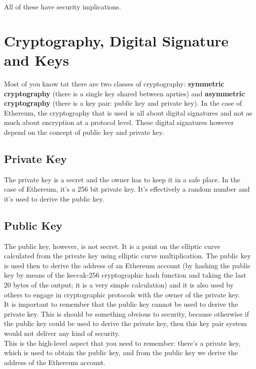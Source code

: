 All of these have security implications.

\section{Cryptography, Digital Signature and Keys}

Most of you know tat there are two classes of cryptography: \textbf{symmetric cryptography} (there is a single key shared between aprties) and \textbf{asymmetric cryptography} (there is a key pair: public key and private key). In the case of Ethereum, the cryptography that is used is all about digital signatures and not as much about encryption at a protocol level.
These digital signatures however depend on the concept of public key and private key.

\subsection*{Private Key}

The private key is a secret and the owner has to keep it in a safe place.
In the case of Ethereum, it's a 256 bit private key.
It's effectively a random number and it's used to derive the public key.

\subsection*{Public Key}

The public key, however, is not secret.
It is a point on the elliptic curve calculated from the private key using elliptic curve multiplication.
The public key is used then to derive the address of an Ethereum account (by hashing the public key by means of the keccak-256 cryptographic hash function and taking the last 20 bytes of the output; it is a very simple calculation) and it is also used by others to engage in cryptographic protocols with the owner of the private key.\\

It is important to remember that the public key cannot be used to derive the private key.
This is should be something obvious to security, because otherwise if the public key could be used to derive the private key, then this key pair system would not deliver any kind of security.\\

This is the high-level aspect that you need to remember: there's a private key, which is used to obtain the public key, and from the public key we derive the address of the Ethereum account.

